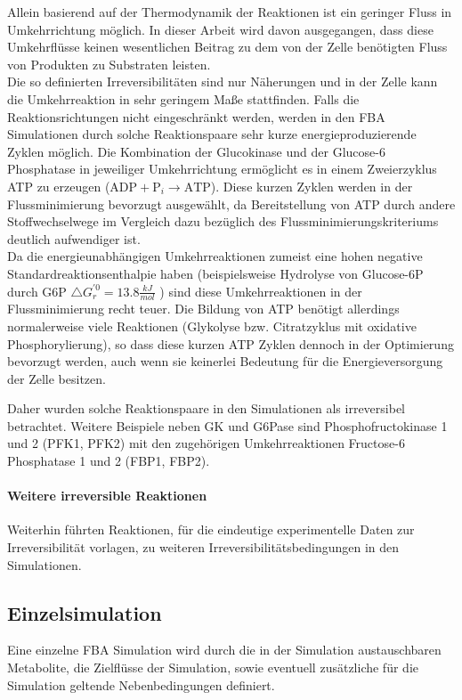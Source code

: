 Allein basierend auf der Thermodynamik der Reaktionen ist ein geringer Fluss in Umkehrrichtung möglich. In dieser Arbeit wird davon ausgegangen, dass diese Umkehrflüsse keinen wesentlichen Beitrag zu dem von der Zelle benötigten Fluss von Produkten zu Substraten leisten.\\
Die so definierten Irreversibilitäten sind nur Näherungen und in der Zelle kann die Umkehrreaktion in sehr geringem Maße stattfinden. Falls die Reaktionsrichtungen nicht eingeschränkt werden, werden in den FBA Simulationen durch solche Reaktionspaare sehr kurze energieproduzierende Zyklen möglich. Die Kombination der Glucokinase und der Glucose-6 Phosphatase in jeweiliger Umkehrrichtung ermöglicht es in einem Zweierzyklus ATP zu erzeugen ($\text{ADP} + \text{P}_i \rightarrow \text{ATP}$). Diese kurzen Zyklen werden in der Flussminimierung bevorzugt ausgewählt, da Bereitstellung von ATP durch andere Stoffwechselwege im Vergleich dazu bezüglich des Flussminimierungskriteriums deutlich aufwendiger ist.\\
Da die energieunabhängigen Umkehrreaktionen zumeist eine hohen negative Standardreaktionsenthalpie haben (beispielsweise Hydrolyse von Glucose-6P durch G6P $\bigtriangleup G_{r}^{'0} = 13.8 \frac{\unit{kJ}}{\unit{mol}}$ \cite{Nelson2008}) sind diese Umkehrreaktionen in der Flussminimierung recht teuer. Die Bildung von ATP benötigt allerdings normalerweise viele Reaktionen (Glykolyse bzw. Citratzyklus mit oxidative Phosphorylierung), so dass diese kurzen ATP Zyklen dennoch in der Optimierung bevorzugt werden, auch wenn sie keinerlei Bedeutung für die Energieversorgung der Zelle besitzen.

Daher wurden solche Reaktionspaare in den Simulationen als irreversibel betrachtet. Weitere Beispiele neben GK und G6Pase sind Phosphofructokinase 1 und 2 (PFK1, PFK2) mit den zugehörigen Umkehrreaktionen Fructose-6 Phosphatase 1 und 2 (FBP1, FBP2).

\paragraph{Weitere irreversible Reaktionen}
Weiterhin führten Reaktionen, für die eindeutige experimentelle Daten zur Irreversibilität vorlagen, zu weiteren Irreversibilitätsbedingungen in den Simulationen.


\subsection{Einzelsimulation}
Eine einzelne FBA  Simulation wird durch die in der Simulation austauschbaren Metabolite, die Zielflüsse der Simulation, sowie eventuell zusätzliche für die Simulation geltende Nebenbedingungen definiert.

